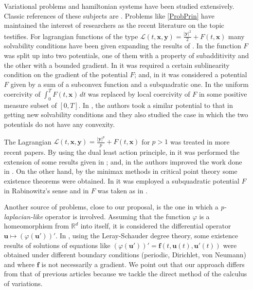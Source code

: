 \documentclass[twoside]{elsarticle}
\theoremstyle{remark}
\renewcommand{\b}[1]{\boldsymbol{#1}}
\newcommand{\rr}{\mathbb{R}}
\begin{document}
Variational problems and hamiltonian systems  have been studied extensively. Classic references of these subjects are
\cite{mawhin2010critical,struwe2008variational,ekeland1999convex}. Problems like \eqref{ProbPrin} have maintained the interest of researchers as the recent literature on the topic testifies. 
For lagrangian functions of the type $\mathcal{L}(t,\b{x},\b{y})=\frac{|\b{y}|^2}{2}+F(t,\b{x})$  many solvability conditions have been given expanding the results of \cite{mawhin2010critical}.  
In  \cite{tang1995periodic} the function $F$ was split up into two potentials, one of them with a property of subadditivity and the other with a bounded gradient.
In \cite{tang1998periodic} it was required a certain sublinearity condition on the gradient of the potential $F$; and, 
in \cite{wu1999periodic} it was considered a potential $F$ given by a sum of a subconvex function and a  subquadratic one. 
In  \cite{tang2001periodic} the uniform coercivity of $\int_0^T F(t,\b{x})\,dt$
was replaced by local coercivity of $F$ in some positive measure subset of $[0,T]$.
In \cite{zhao2004periodic}, the authors took a similar potential to that in \cite{wu1999periodic} getting new solvability conditions 
and they also studied the case in which the two potentials do not have any convexity.
%

The Lagrangian  $\mathcal{L}(t,\b{x},\b{y})=\frac{|\b{y}|^p}{p}+F(t,\b{x})$
for $p>1$ was treated in more recent papers.
By using the dual least action principle, in \cite{Tian2007192}
it was performed the extension of some results given in \cite{mawhin2010critical};
and, in \cite{tang2010periodic} the authors improved the work done in \cite{wu1999periodic}.
On the other hand, by the minimax methods in critical point theory 
some existence theorems were obtained.
In \cite{xu2007some} it was employed a subquadratic potential $F$ 
in Rabinowitz{}'s sense 
and in \cite{ye2008periodic} $F$ was taken as in \cite{tang1998periodic}.

Another source of problems, close to our proposal, is the one in which a \emph {p-laplacian-like} operator is involved.
Assuming that the function $\varphi$ is a homeomorphism  from $\rr^d$ into itself, it is considered the differential operator
$\b u \mapsto (\varphi(\b u'))'$. 
In  \cite{C-2007,C-2009, 
Cristia-2008, manasevich2000boundary, manasevich1998periodic}, using 
the Leray-Schauder degree theory,
some existence results of solutions of equations 
like 
$(\varphi({\b u}'))'={\b f}(t,{\b u}(t),{\b u}'(t))$ were obtained 
under different boundary conditions (periodic, Dirichlet, von Neumann) 
and where $\b f$ is not necessarily a gradient. 
We point out that our approach 
differs from that of previous articles because
we tackle the direct method of the calculus of variations.
\end{document}
